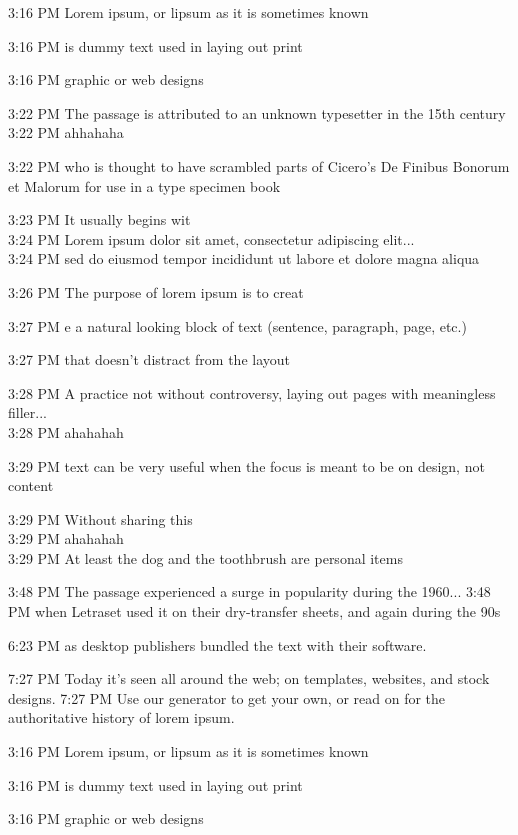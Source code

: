 \documentclass{article}
\begin{document}
\begin{chat}

3:16 PM Lorem ipsum, or lipsum as it is sometimes known

3:16 PM is dummy text used in laying out print

3:16 PM graphic or web designs

3:22 PM The passage is attributed to an unknown typesetter in the 15th century\\
3:22 PM ahhahaha

3:22 PM who is thought to have scrambled parts of Cicero's De Finibus Bonorum et Malorum for use in a type specimen book

3:23 PM It usually begins wit\\
3:24 PM Lorem ipsum dolor sit amet, consectetur adipiscing elit...\\
3:24 PM sed do eiusmod tempor incididunt ut labore et dolore magna aliqua

3:26 PM The purpose of lorem ipsum is to creat

3:27 PM e a natural looking block of text (sentence, paragraph, page, etc.)

3:27 PM that doesn't distract from the layout

3:28 PM A practice not without controversy, laying out pages with meaningless filler...\\
3:28 PM ahahahah

3:29 PM text can be very useful when the focus is meant to be on design, not content

3:29 PM Without sharing this \\
3:29 PM ahahahah\\
3:29 PM At least the dog and the toothbrush are personal items

3:48 PM The passage experienced a surge in popularity during the 1960...
3:48 PM when Letraset used it on their dry-transfer sheets, and again during the 90s

6:23 PM as desktop publishers bundled the text with their software.

7:27 PM Today it's seen all around the web; on templates, websites, and stock designs.
7:27 PM Use our generator to get your own, or read on for the authoritative history of lorem ipsum. 

3:16 PM Lorem ipsum, or lipsum as it is sometimes known

3:16 PM is dummy text used in laying out print

3:16 PM graphic or web designs


\end{chat}
\end{document}
